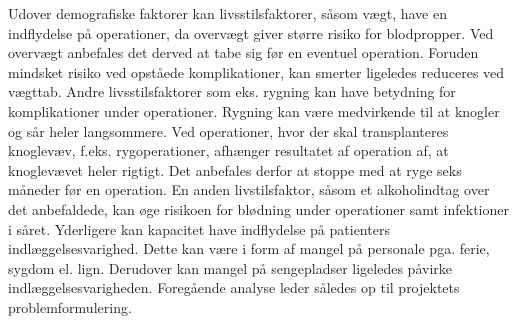 Udover demografiske faktorer kan livsstilsfaktorer, såsom vægt, have en indflydelse på
operationer, da overvægt giver større risiko
for blodpropper\cite{Edmonds2004}. Ved overvægt anbefales det derved at tabe sig før
en eventuel operation. Foruden mindsket risiko ved opståede komplikationer, kan
smerter ligeledes reduceres ved vægttab.
Andre livsstilsfaktorer som eks. rygning kan have betydning
for komplikationer under operationer. Rygning kan være medvirkende til at knogler
og sår heler langsommere. Ved operationer, hvor der skal transplanteres knoglevæv, f.eks. rygoperationer, afhænger resultatet af operation af, at knoglevævet heler rigtigt.
Det anbefales derfor at stoppe med at ryge seks måneder før en operation. En anden livstilsfaktor, såsom et alkoholindtag over det anbefaldede, kan øge risikoen for blødning under operationer samt infektioner i såret.\cite{Nordjylland2014}
Yderligere kan kapacitet have indflydelse på patienters indlæggelsesvarighed. Dette kan være i form af mangel på personale pga. ferie, sygdom el. lign. 
Derudover kan mangel på sengepladser ligeledes påvirke indlæggelsesvarigheden.
Foregående analyse leder således op til projektets problemformulering.



